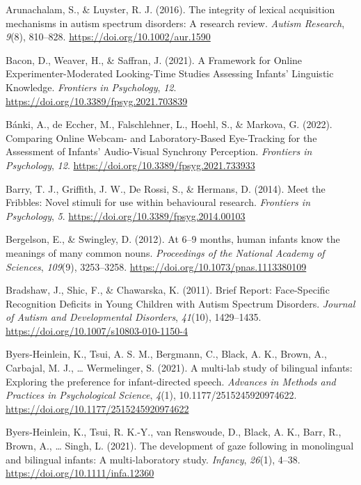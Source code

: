 \documentclass[
  english,
  man,floatsintext]{apa6}
\newlength{\cslhangindent}
\newenvironment{CSLReferences}[2] %
 {\begin{list}{}{%
  \setlength{\itemindent}{0pt}
  \setlength{\leftmargin}{0pt}
  \setlength{\parsep}{0pt}
  \ifodd #1
   \setlength{\leftmargin}{\cslhangindent}
   \setlength{\itemindent}{-1\cslhangindent}
  \fi
  \setlength{\itemsep}{#2\baselineskip}}}
 {\end{list}}
\begin{document}
\protect{}\label{refs}
\begin{CSLReferences}{1}{0}
Arunachalam, S., \& Luyster, R. J. (2016). The integrity of lexical acquisition mechanisms in autism spectrum disorders: {A} research review. \emph{Autism Research}, \emph{9}(8), 810--828. \url{https://doi.org/10.1002/aur.1590}

Bacon, D., Weaver, H., \& Saffran, J. (2021). A {Framework} for {Online Experimenter-Moderated Looking-Time Studies Assessing Infants}' {Linguistic Knowledge}. \emph{Frontiers in Psychology}, \emph{12}. \url{https://doi.org/10.3389/fpsyg.2021.703839}

{Bánki, A., de Eccher, M., Falschlehner, L., Hoehl, S., \& Markova, G.} (2022). Comparing {Online Webcam-} and {Laboratory-Based Eye-Tracking} for the {Assessment} of {Infants}' {Audio-Visual Synchrony Perception}. \emph{Frontiers in Psychology}, \emph{12}. \url{https://doi.org/10.3389/fpsyg.2021.733933}

Barry, T. J., Griffith, J. W., De Rossi, S., \& Hermans, D. (2014). Meet the {Fribbles}: Novel stimuli for use within behavioural research. \emph{Frontiers in Psychology}, \emph{5}. \url{https://doi.org/10.3389/fpsyg.2014.00103}

Bergelson, E., \& Swingley, D. (2012). At 6--9 months, human infants know the meanings of many common nouns. \emph{Proceedings of the National Academy of Sciences}, \emph{109}(9), 3253--3258. \url{https://doi.org/10.1073/pnas.1113380109}

Bradshaw, J., Shic, F., \& Chawarska, K. (2011). Brief {Report}: {Face-Specific Recognition Deficits} in {Young Children} with {Autism Spectrum Disorders}. \emph{Journal of Autism and Developmental Disorders}, \emph{41}(10), 1429--1435. \url{https://doi.org/10.1007/s10803-010-1150-4}

Byers-Heinlein, K., Tsui, A. S. M., Bergmann, C., Black, A. K., Brown, A., Carbajal, M. J., \ldots{} Wermelinger, S. (2021). A multi-lab study of bilingual infants: {Exploring} the preference for infant-directed speech. \emph{Advances in Methods and Practices in Psychological Science}, \emph{4}(1), 10.1177/2515245920974622. \url{https://doi.org/10.1177/2515245920974622}

{Byers-Heinlein, K., Tsui, R. K.-Y., van Renswoude, D., Black, A. K., Barr, R., Brown, A., \ldots{} Singh, L.} (2021). The development of gaze following in monolingual and bilingual infants: {A} multi-laboratory study. \emph{Infancy}, \emph{26}(1), 4--38. \url{https://doi.org/10.1111/infa.12360}


\end{CSLReferences}
\end{document}
